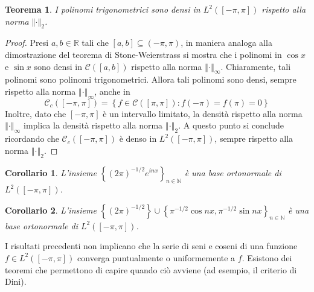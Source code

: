 \documentclass[a4paper,11pt]{book}
\newcommand{\R}{\mathbb{R}}
\newcommand{\norm}[1]{\left\Vert#1\right\Vert}
\theoremstyle{theorem}
\newtheorem{teorema}{Teorema}[section]
\newtheorem{corollario}{Corollario}[section]
\theoremstyle{definition}
\begin{document}
\begin{teorema}
	I polinomi trigonometrici sono densi in $L^2([-\pi,\pi])$ rispetto alla norma $\norm{\cdot}_2$.
\end{teorema}
\begin{proof}
	Presi $a,b\in\R$ tali che $[a,b]\subseteq(-\pi,\pi)$, in maniera analoga alla dimostrazione del teorema di Stone-Weierstrass si mostra che i polinomi in $\cos x$ e $\sin x$ sono densi in $\mathcal{C}([a,b])$ rispetto alla norma $\norm{\cdot}_\infty$. Chiaramente, tali polinomi sono polinomi trigonometrici. Allora tali polinomi sono densi, sempre rispetto alla norma $\norm{\cdot}_\infty$, anche in
	\[\mathcal{C}_c([-\pi,\pi])=\left\{f\in \mathcal{C}([\pi,\pi]):f(-\pi)=f(\pi)=0\right\}\]
	Inoltre, dato che $[-\pi,\pi]$ è un intervallo limitato, la densità rispetto alla norma $\norm{\cdot}_\infty$ implica la densità rispetto alla norma $\norm{\cdot}_2$. A questo punto si conclude ricordando che $\mathcal{C}_c([-\pi,\pi])$ è denso in $L^2([-\pi,\pi])$, sempre rispetto alla norma $\norm{\cdot}_2$.
\end{proof}
\begin{corollario}
	L'insieme $\left\{(2\pi)^{-1/2}e^{inx}\right\}_{n\in\mathbb{N}}$ è una base ortonormale di $L^2([-\pi,\pi])$.
\end{corollario}
\begin{corollario}
	L'insieme $\left\{(2\pi)^{-1/2}\right\}\cup\left\{\pi^{-1/2}\cos nx,\pi^{-1/2}\sin nx\right\}_{n\in\mathbb{N}}$ è una base ortonormale di $L^2([-\pi,\pi])$.
\end{corollario}

\noindent I risultati precedenti non implicano che la serie di seni e coseni di una funzione $f\in L^2([-\pi,\pi])$ converga puntualmente o uniformemente a $f$. Esistono dei teoremi che permettono di capire quando ciò avviene (ad esempio, il criterio di Dini).
\end{document}

